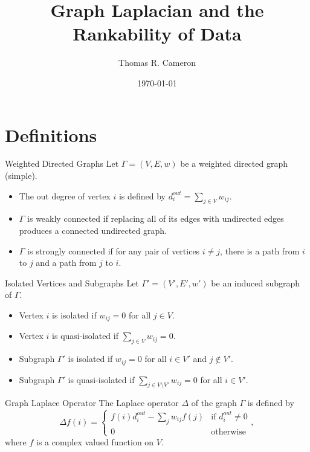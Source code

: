 \documentclass{beamer}
\title{Graph Laplacian and the Rankability of Data}
\author{Thomas R. Cameron}
\institute{Davidson College}
\date{\today}
\begin{document}
\begin{frame}
	\titlepage
\end{frame}


\section{Definitions}

\begin{frame}{Weighted Directed Graphs}
Let $\Gamma=(V,E,w)$ be a weighted directed graph (simple).
\vfill
\begin{itemize}
\item The out degree of vertex $i$ is defined by $d_{i}^{out}=\sum_{j\in V}w_{ij}$.
\vfill
\item	$\Gamma$ is weakly connected if replacing all of its edges with undirected edges produces a connected undirected graph.
\vfill
\item	$\Gamma$ is strongly connected if for any pair of vertices $i\neq j$, there is a path from $i$ to $j$ and a path from $j$ to $i$. 
\end{itemize}
\vfill
\end{frame}

\begin{frame}{Isolated Vertices and Subgraphs}
Let $\Gamma'=(V',E',w')$ be an induced subgraph of $\Gamma$.
\vfill
\begin{itemize}
\item	Vertex $i$ is isolated if $w_{ij}=0$ for all $j\in V$.
\vfill
\item	Vertex $i$ is quasi-isolated if $\sum_{j\in V}w_{ij}=0$.
\vfill
\item	Subgraph $\Gamma'$ is isolated if $w_{ij}=0$ for all $i\in V'$ and $j\notin V'$.
\vfill
\item Subgraph $\Gamma'$ is quasi-isolated if $\sum_{j\in V\setminus{V'}}w_{ij}=0$ for all $i\in V'$.  
\end{itemize}
\vfill
\end{frame}

\begin{frame}{Graph Laplace Operator}
The Laplace operator $\Delta$ of the graph $\Gamma$ is defined by
\vfill
\[
\Delta f(i) = 	\begin{cases}
			f(i)d_{i}^{out} - \sum_{j}w_{ij}f(j) & \text{if $d_{i}^{out}\neq 0$} \\
			0	&	\text{otherwise}
			\end{cases},
\]
\vfill
where $f$ is a complex valued function on $V$.
\vfill
\end{frame}
\end{document}

